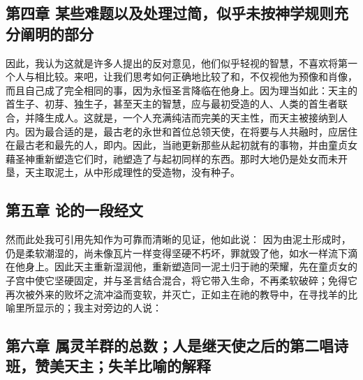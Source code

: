 
\subsection{第四章 某些难题以及处理过简，似乎未按神学规则充分阐明的部分}

因此，我认为这就是许多人提出的反对意见，他们似乎轻视的智慧，不喜欢将第一个人与相比较。来吧，让我们思考如何正确地比较了和，不仅视他为预像和肖像，而且自己成了完全相同的事，因为永恒圣言降临在他身上。因为理当如此：天主的首生子、初芽、独生子，甚至天主的智慧，应与最初受造的人、人类的首生者联合，并降生成人。这就是，一个人充满纯洁而完美的天主性，而天主被接纳到人内。因为最合适的是，最古老的永世和首位总领天使，在将要与人共融时，应居住在最古老和最先的人，即内。因此，当祂更新那些从起初就有的事物，并由童贞女藉圣神重新塑造它们时，祂塑造了与起初同样的东西。那时大地仍是处女而未开垦，天主取泥土，从中形成理性的受造物，没有种子。\par


\subsection{第五章 论的一段经文}

然而此处我可引用先知作为可靠而清晰的见证，他如此说：  因为由泥土形成时，仍是柔软潮湿的，尚未像瓦片一样变得坚硬不朽坏，罪就毁了他，如水一样流下滴在他身上。因此天主重新湿润他，重新塑造同一泥土归于祂的荣耀，先在童贞女的子宫中使它坚硬固定，并与圣言结合混合，将它带入生命，不再柔软破碎；免得它再次被外来的败坏之流冲溢而变软，并灭亡，正如主在祂的教导中，在寻找羊的比喻里所显示的；我主对旁边的人说：\par


\subsection{第六章 属灵羊群的总数；人是继天使之后的第二唱诗班，赞美天主；失羊比喻的解释}

